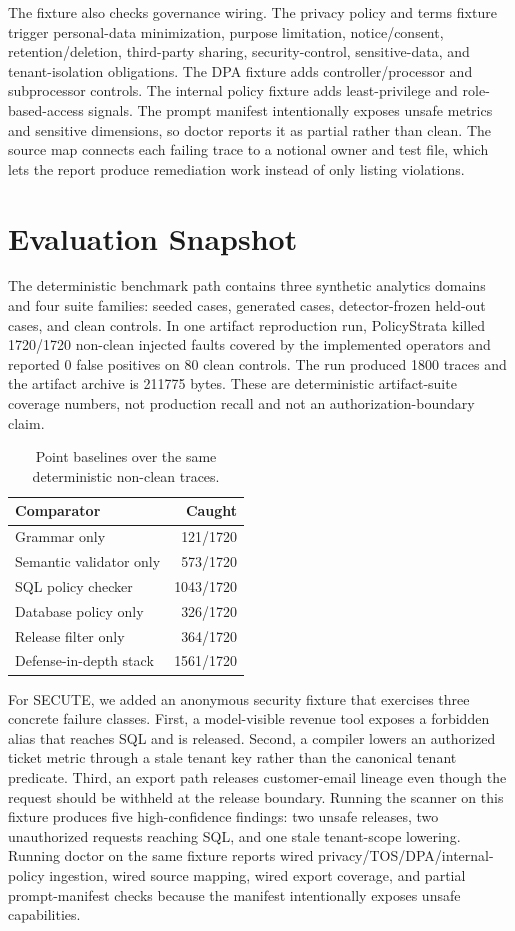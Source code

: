 \documentclass[sigconf,review,anonymous]{acmart}
\newcommand{\tool}{PolicyStrata}
\begin{document}
The fixture also checks governance wiring. The privacy policy and terms fixture
trigger personal-data minimization, purpose limitation, notice/consent,
retention/deletion, third-party sharing, security-control, sensitive-data, and
tenant-isolation obligations. The DPA fixture adds controller/processor and
subprocessor controls. The internal policy fixture adds least-privilege and
role-based-access signals. The prompt manifest intentionally exposes unsafe
metrics and sensitive dimensions, so doctor reports it as partial rather than
clean. The source map connects each failing trace to a notional owner and test
file, which lets the report produce remediation work instead of only listing
violations.

\section{Evaluation Snapshot}

The deterministic benchmark path contains three synthetic analytics domains and
four suite families: seeded cases, generated cases, detector-frozen held-out
cases, and clean controls. In one artifact reproduction run, \tool{} killed
1720/1720 non-clean injected faults covered by the implemented operators and
reported 0 false positives on 80 clean controls. The run produced 1800 traces and
the artifact archive is 211775 bytes. These are deterministic artifact-suite
coverage numbers, not production recall and not an authorization-boundary claim.

\begin{table}[t]
\caption{Point baselines over the same deterministic non-clean traces.}
\label{tab:baselines}
\begin{tabular}{lr}
\toprule
Comparator & Caught \\
\midrule
Grammar only & 121/1720 \\
Semantic validator only & 573/1720 \\
SQL policy checker & 1043/1720 \\
Database policy only & 326/1720 \\
Release filter only & 364/1720 \\
Defense-in-depth stack & 1561/1720 \\
\bottomrule
\end{tabular}
\end{table}

For SECUTE, we added an anonymous security fixture that exercises three concrete
failure classes. First, a model-visible revenue tool exposes a forbidden alias
that reaches SQL and is released. Second, a compiler lowers an authorized ticket
metric through a stale tenant key rather than the canonical tenant predicate.
Third, an export path releases customer-email lineage even though the request
should be withheld at the release boundary. Running the scanner on this fixture
produces five high-confidence findings: two unsafe releases, two unauthorized
requests reaching SQL, and one stale tenant-scope lowering. Running doctor on
the same fixture reports wired privacy/TOS/DPA/internal-policy ingestion, wired
source mapping, wired export coverage, and partial prompt-manifest checks because
the manifest intentionally exposes unsafe capabilities.
\end{document}
